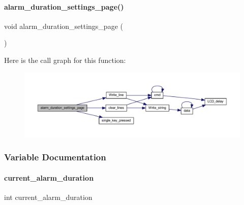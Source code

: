 \paragraph{alarm\+\_\+duration\+\_\+settings\+\_\+page()}
{\footnotesize\ttfamily void alarm\+\_\+duration\+\_\+settings\+\_\+page (\begin{DoxyParamCaption}{ }\end{DoxyParamCaption})}

Here is the call graph for this function\+:
\nopagebreak
\begin{figure}[H]
\begin{center}
\leavevmode
\includegraphics[width=350pt]{a00005_adc10f1c6bb2de8f4dd4d65901c941c0f_cgraph}
\end{center}
\end{figure}


\subsubsection{Variable Documentation}
\mbox{\label{a00005_ab073eeb8d5a2147ef91fab51d73ab4b2}} 
\paragraph{current\+\_\+alarm\+\_\+duration}
{\footnotesize\ttfamily int current\+\_\+alarm\+\_\+duration}

